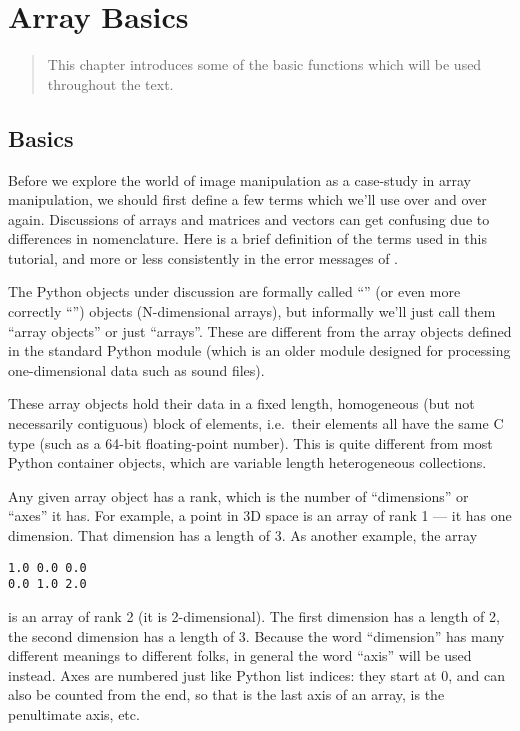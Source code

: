 \chapter{Array Basics}
\label{cha:array-basics}

\begin{quote} 
   This chapter introduces some of the basic functions which will be used
   throughout the text.
\end{quote}

\section{Basics}
\label{sec:arraybasics:basics}

Before we explore the world of image manipulation as a case-study in array
manipulation, we should first define a few terms which we'll use over and
over again. Discussions of arrays and matrices and vectors can get confusing
due to differences in nomenclature. Here is a brief definition of the terms
used in this tutorial, and more or less consistently in the error messages of
\numarray{}.

The Python objects under discussion are formally called ``\NUMARRAY{}'' (or
even more correctly ``\numarray{}'') objects (N-dimensional arrays), but
informally we'll just call them ``array objects'' or just ``arrays''. These are
different from the array objects defined in the standard Python 
module (which is an older module designed for processing one-dimensional data
such as sound files).

These array objects hold their data in a fixed length, homogeneous (but not
necessarily contiguous) block of elements, i.e.\ their elements all have the
same C type (such as a 64-bit floating-point number). This is quite different
from most Python container objects, which are variable length heterogeneous
collections.

Any given array object has a rank, which is the number of
``dimensions'' or ``axes'' it has. For example, a point in 3D space \code{[1,
   2, 1]} is an array of rank 1 --- it has one dimension. That dimension has a
length of 3.  As another example, the array
\begin{verbatim}
1.0 0.0 0.0
0.0 1.0 2.0
\end{verbatim}
is an array of rank 2 (it is 2-dimensional). The first dimension has a length
of 2, the second dimension has a length of 3. Because the word ``dimension''
has many different meanings to different folks, in general the word ``axis''
will be used instead. Axes are numbered just like Python list indices: they
start at 0, and can also be counted from the end, so that  is the
last axis of an array,  is the penultimate axis, etc.  

